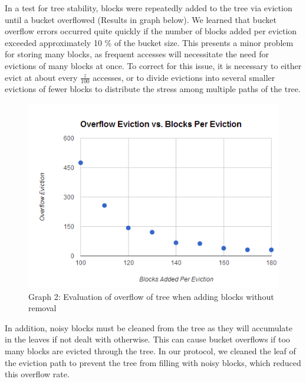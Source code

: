 \documentclass[12pt, oneside]{article}   	%
\begin{document}
In a test for tree stability, blocks were repeatedly added to the tree via eviction until a bucket overflowed (Results in graph below). We learned that bucket overflow errors occurred quite quickly if the number of blocks added per eviction exceeded approximately 10 \% of the bucket size. This presents a minor problem for storing many blocks, as frequent accesses will necessitate the need for evictions of many blocks at once. To correct for this issue, it is necessary to either evict at about every $\frac{z}{100}$ accesses, or to divide evictions into several smaller evictions of fewer blocks to distribute the stress among multiple paths of the tree.

\begin{figure}[H]
  \includegraphics[width=\linewidth]{overflowgraph}
  \caption{Graph 2: Evaluation of overflow of tree when adding blocks without removal}
  \label{fig:overflowgraph}
\end{figure}

In addition, noisy blocks must be cleaned from the tree as they will accumulate in the leaves if not dealt with otherwise. This can cause bucket overflows if too many blocks are evicted through the tree. In our protocol, we cleaned the leaf of the eviction path to prevent the tree from filling with noisy blocks, which reduced this overflow rate.
\end{document}
